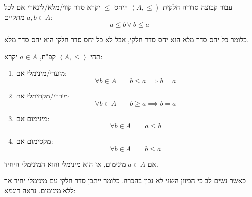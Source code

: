 \documentclass{tstextbook}
\begin{document}
\begin{definition}
עבור קבוצה סדורה חלקית \(\left\langle   A,\leq  \right\rangle\) היחס \(\leq\) יקרא סדר קווי/מלא/לינארי אם לכל \(a,b \in A\) מתקיים:
$$a\leq b \lor b\leq a$$

\end{definition}
כלומר כל יחס סדר מלא הוא יחס סדר חלקי, אבל לא כל יחס סדר חלקי הוא יחס סדר מלא.

\begin{definition}
תהי \(\left\langle  A,\leq  \right\rangle\) קפ"ח, \(a\in A\) יקרא:

  \begin{enumerate}
    \item מזערי/מינימלי אם: 
$$\forall b \in A\qquad  b\leq a\implies b=a$$


    \item מירבי/מקסימלי אם: 
$$\forall b \in A\qquad b\geq a\implies b=a$$


    \item מינימום אם: 
$$\forall b \in A\qquad a\leq b$$


    \item מקסימום אם: 
$$\forall b \in A\qquad  b \leq a$$


  \end{enumerate}
\end{definition}
\begin{proposition}
אם \(a \in A\) מינימום, אז הוא מינימלי והוא המינימלי היחיד.

\end{proposition}
כאשר נשים לב כי הכיוון השני לא נכון בהכרח. כלומר ייתכן סדר חלקי עם מינימלי יחיד אך ללא מינימום. נראה דוגמא:
\end{document}
